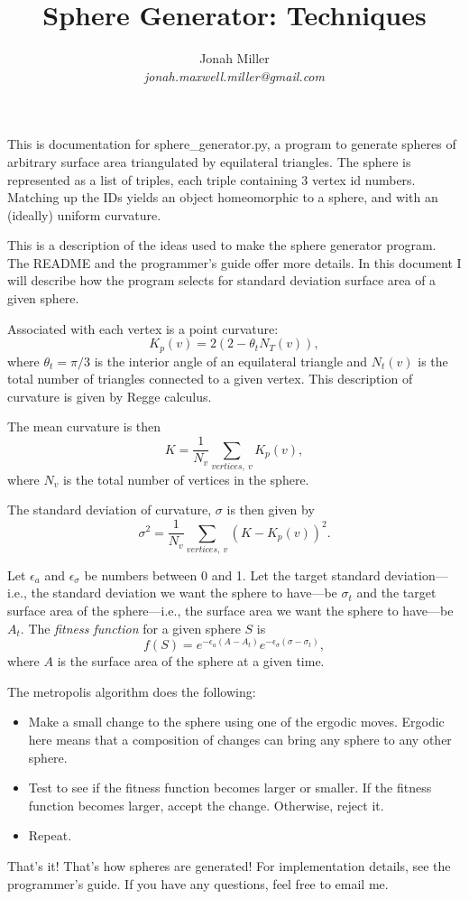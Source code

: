 \documentclass{article}
\title{Sphere Generator: Techniques}
\author{Jonah Miller\\\textit{jonah.maxwell.miller@gmail.com}}
\begin{document}
\maketitle

This is documentation for sphere\_generator.py, a program to generate
spheres of arbitrary surface area triangulated by equilateral
triangles. The sphere is represented as a list of triples, each triple
containing 3 vertex id numbers. Matching up the IDs yields an object
homeomorphic to a sphere, and with an (ideally) uniform curvature.

This is a description of the ideas used to make the sphere generator
program. The README and the programmer's guide offer more details. In
this document I will describe how the program selects for standard
deviation surface area of a given sphere.

Associated with each vertex is a point curvature:
$$K_p(v) = 2(2 - \theta_t N_T(v)),$$
where $\theta_t = \pi/3$ is the interior angle of an equilateral
triangle and $N_t(v)$ is the total number of triangles connected to a
given vertex. This description of curvature is given by Regge
calculus.

The mean curvature is then 
$$K = \frac{1}{N_v}\sum_{vertices, \ v} K_p(v),$$
where $N_v$ is the total number of vertices in the sphere.

The standard deviation of curvature, $\sigma$ is then given by
$$\sigma^2 = \frac{1}{N_v} \sum_{vertices, \ v}\left(K - K_p(v)\right)^2.$$

Let $\epsilon_a$ and $\epsilon_\sigma$ be numbers between 0 and 1. Let
the target standard deviation---i.e., the standard deviation we want
the sphere to have---be $\sigma_t$ and the target surface area of the
sphere---i.e., the surface area we want the sphere to have---be
$A_t$. The \textit{fitness function} for a given sphere $S$ is
$$f(S) = e^{-\epsilon_a (A - A_t)}e^{-\epsilon_\sigma (\sigma - \sigma_t)},$$
where $A$ is the surface area of the sphere at a given time. 

The metropolis algorithm does the following:
\begin{itemize}
\item Make a small change to the sphere using one of the ergodic
  moves. Ergodic here means that a composition of changes can bring
  any sphere to any other sphere.
\item Test to see if the fitness function becomes larger or
  smaller. If the fitness function becomes larger, accept the
  change. Otherwise, reject it.
\item Repeat.
\end{itemize}

That's it! That's how spheres are generated! For implementation
details, see the programmer's guide. If you have any questions, feel
free to email me.
\end{document}
